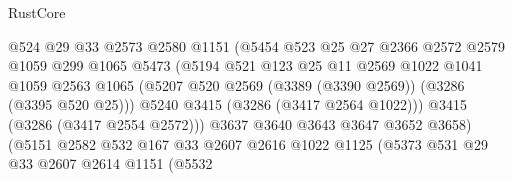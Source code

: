 \begin{lexlean}{RustCore}
\begin{coremodule}
                                  @524
                                  @29
                                  @33
                                  @2573
                                  @2580
                                  @1151
                                  (@5454
                                    @523
                                    @25
                                    @27
                                    @2366
                                    @2572
                                    @2579
                                    @1059
                                    @299
                                    @1065
                                    @5473
                                    (@5194
                                      @521
                                      @123
                                      @25
                                      @11
                                      @2569
                                      @1022
                                      @1041
                                      @1059
                                      @2563
                                      @1065
                                      (@5207
                                        @520
                                        @2569
                                        (@3389 (@3390 @2569))
                                        (@3286 (@3395 @520 @25)))
                                      @5240
                                      @3415
                                      (@3286 (@3417 @2564 @1022)))
                                    @3415
                                    (@3286 (@3417 @2554 @2572)))
                                  @3637
                                  @3640
                                  @3643
                                  @3647
                                  @3652
                                  @3658)
                                (@5151
                                  @2582
                                  @532
                                  @167
                                  @33
                                  @2607
                                  @2616
                                  @1022
                                  @1125
                                  (@5373
                                    @531
                                    @29
                                    @33
                                    @2607
                                    @2614
                                    @1151
                                    (@5532

\end{coremodule}
\end{lexlean}
